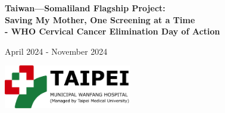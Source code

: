 \documentclass{article}
\begin{document}
\begin{titlepage}

\hspace*{-0.7cm}%
\begin{tikzpicture} %


\hspace{1.4cm}
%

\end{tikzpicture}
    \vspace{2cm}
    
\centering
    {\Huge\bfseries Taiwan---Somaliland Flagship Project:\\
Saving My Mother, One Screening at a Time \\
- WHO Cervical Cancer Elimination Day of Action \\
    \par } %
    \vspace{1.5cm}
    {\Large April 2024 - November 2024 \par}


\vspace{1.5cm}
%
%


\vspace{0.5cm}

\includegraphics[height=1.9cm]{TMWH_logo_TAIPEI_vector.pdf}


%
% 
% 




\end{titlepage}
\end{document}

